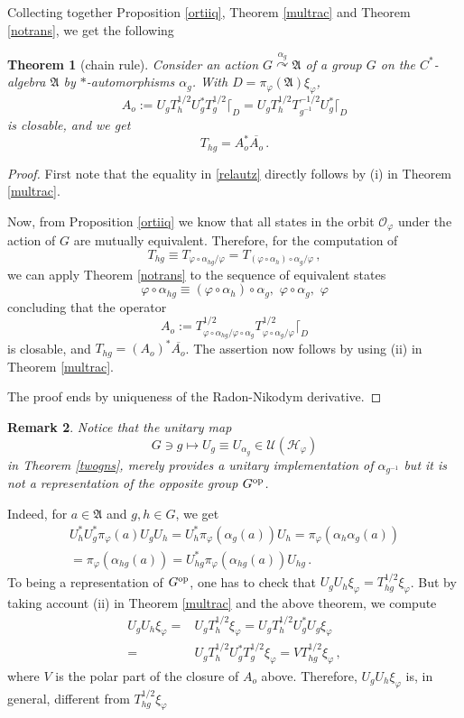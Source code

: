 \documentclass[12pt]{amsart}
\numberwithin{equation}{section}
\def\ch{{\mathcal H}}
\def\co{{\mathcal O}}
\def\cu{{\mathcal U}}
\def\ga{{\mathfrak A}} \def\gpa{{\mathfrak a}}
\def\a{\alpha}
\def\f{\varphi}\def\ff{\phi} \def\F{\Phi}
\newtheorem{thm}{Theorem}[section]
\newtheorem{rem}[thm]{Remark}
\begin{document}
Collecting together Proposition \ref{ortiiq}, Theorem \ref{multrac} and Theorem \ref{notrans}, we get the following
\begin{thm}[chain rule]
\label{lenire}
Consider an action $G\stackrel{\a_g}{\curvearrowright}\ga$ of a group $G$ on the $C^*$-algebra $\ga$ by $*$-automorphisms $\a_g$. With $D=\pi_\f(\ga)\xi_\f$, 
\begin{equation}
\label{relautz}
A_o:=U_g T_h^{1/2}U_g^*T_g^{1/2}\lceil_D=U_g T_h^{1/2}T_{g^{-1}}^{-1/2}U_g^*\lceil_D
\end{equation}
is closable, and we get
$$
T_{hg}=A_o^*\overline{A_o}\,.
$$
\end{thm}
\begin{proof}
First note that the equality in \eqref{relautz} directly follows by (i) in Theorem \ref{multrac}.

Now, from Proposition \ref{ortiiq} we know that all states in the orbit $\co_\f$ under the action of $G$ are mutually equivalent. Therefore, for the computation of 
$$
T_{hg}\equiv T_{\f\circ\a_{hg}/\f}=T_{(\f\circ\a_{h})\circ\a_g/\f}\,,
$$
we can apply Theorem \ref{notrans} to the sequence of equivalent states
$$
\f\circ\a_{hg}\equiv(\f\circ\a_{h})\circ\a_g,\,\,\f\circ\a_g,\,\,\f
$$
concluding that the operator
$$
A_o:=T^{1/2}_{\f\circ\a_{hg}/\f\circ\a_g}T^{1/2}_{\f\circ\a_{g}/\f}\lceil_{D}
$$ 
is closable, and
$T_{hg}=(A_o)^*\overline{A_o}$. The assertion now follows by using (ii) in Theorem \ref{multrac}.

The proof ends by uniqueness of the Radon-Nikodym derivative.
\end{proof}
\begin{rem}
\label{lenire0}
Notice that the unitary map 
$$
G\ni g\mapsto U_g\equiv U_{\a_g}\in\cu(\ch_\f)
$$ 
in Theorem \ref{twogns}, merely provides a unitary implementation of $\a_{g^{-1}}$ but it is not a representation of 
the opposite group $G^{\rm op}$. 
\end{rem}
Indeed, for $a\in\ga$ and $g,h\in G$, we get
\begin{align*}
U^*_hU^*_g\pi_\f(a)U_gU_h=U^*_h\pi_\f(\a_g(a))U_h=\pi_\f(\a_h\a_g(a))\\
=\pi_\f(\a_{hg}(a))
=U^*_{hg}\pi_\f(\a_{hg}(a))U_{hg}\,.
\end{align*}
To being a representation of $G^{\rm op}$, one has to check that $U_gU_h\xi_\f=T_{hg}^{1/2}\xi_\f$. But by taking account (ii) in Theorem \ref{multrac} and the above theorem, we compute
\begin{align*}
U_gU_h\xi_\f=&U_g T_h^{1/2}\xi_\f= U_gT_h^{1/2}U_g^*U_g\xi_\f\\
=&U_gT_h^{1/2}U_g^*T^{1/2}_g\xi_\f=VT^{1/2}_{hg}\xi_\f\,,
\end{align*}
where $V$ is the polar part of the closure of $A_o$ above. Therefore, $U_gU_h\xi_\f$ is, in general, different from $T_{hg}^{1/2}\xi_\f$
\end{document}
